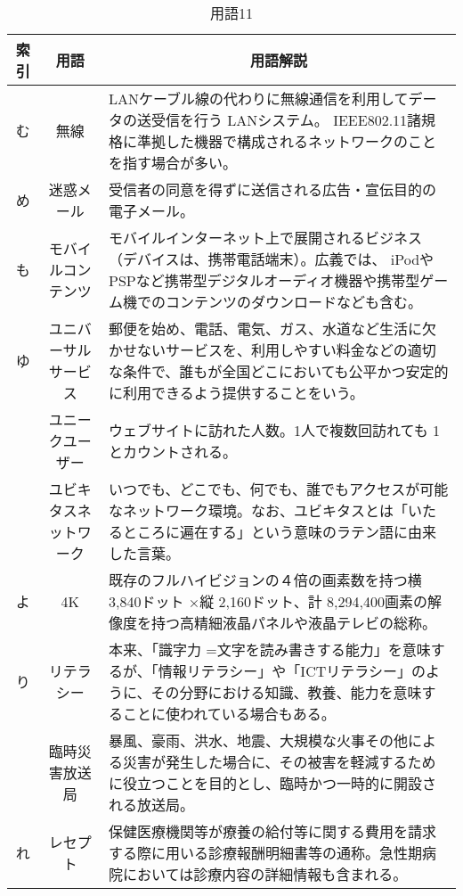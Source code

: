 \begin{table}[htb]
  \begin{center}
    \caption{用語11}
    \begin{tabular}{|c|c|p{10cm}|}
      \hline
      索引 & 用語 & \multicolumn{1}{c|}{用語解説} \\
      \hline
      む & 無線 & LANケーブル線の代わりに無線通信を利用してデータの送受信を行う LANシステム。 IEEE802.11諸規格に準拠した機器で構成されるネットワークのことを指す場合が多い。\\
      \hline
      め & 迷惑メール & 受信者の同意を得ずに送信される広告・宣伝目的の電子メール。\\
      \hline
      も & モバイルコンテンツ & モバイルインターネット上で展開されるビジネス（デバイスは、携帯電話端末）。広義では、 iPodやPSPなど携帯型デジタルオーディオ機器や携帯型ゲーム機でのコンテンツのダウンロードなども含む。\\
      \hline
      ゆ & ユニバーサルサービス & 郵便を始め、電話、電気、ガス、水道など生活に欠かせないサービスを、利用しやすい料金などの適切な条件で、誰もが全国どこにおいても公平かつ安定的に利用できるよう提供することをいう。\\
      \cline{2-3}
      & ユニークユーザー & ウェブサイトに訪れた人数。1人で複数回訪れても 1とカウントされる。\\
      \cline{2-3}
      & ユビキタスネットワーク & いつでも、どこでも、何でも、誰でもアクセスが可能なネットワーク環境。なお、ユビキタスとは「いたるところに遍在する」という意味のラテン語に由来した言葉。\\
      \hline
      よ & 4K & 既存のフルハイビジョンの４倍の画素数を持つ横 3,840ドット ×縦 2,160ドット、計 8,294,400画素の解像度を持つ高精細液晶パネルや液晶テレビの総称。\\
      \hline
      り & リテラシー & 本来、「識字力 =文字を読み書きする能力」を意味するが、「情報リテラシー」や「ICTリテラシー」のように、その分野における知識、教養、能力を意味することに使われている場合もある。\\
      \cline{2-3}
      & 臨時災害放送局 & 暴風、豪雨、洪水、地震、大規模な火事その他による災害が発生した場合に、その被害を軽減するために役立つことを目的とし、臨時かつ一時的に開設される放送局。\\
      \hline
      れ & レセプト & 保健医療機関等が療養の給付等に関する費用を請求する際に用いる診療報酬明細書等の通称。急性期病院においては診療内容の詳細情報も含まれる。\\
      \hline
    \end{tabular}
  \end{center}
\end{table}


